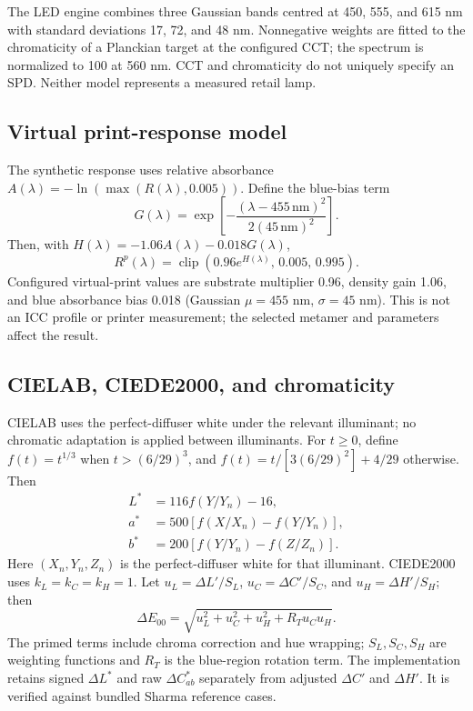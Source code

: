 \documentclass[journal]{IEEEtran}
\newcommand{\dE}{\ensuremath{\Delta E_{00}}}
\begin{document}
The LED engine combines three Gaussian bands centred at 450, 555, and 615 nm with standard deviations 17, 72, and 48 nm. Nonnegative weights are fitted to the chromaticity of a Planckian target at the configured CCT; the spectrum is normalized to 100 at 560 nm. CCT and chromaticity do not uniquely specify an SPD. Neither model represents a measured retail lamp.

\subsection{Virtual print-response model}
The synthetic response uses relative absorbance $A(\lambda)=-\ln(\max(R(\lambda),0.005))$. Define the blue-bias term
\begin{equation}
G(\lambda)=\exp\!\left[-\frac{(\lambda-455\,\mathrm{nm})^2}{2(45\,\mathrm{nm})^2}\right].
\end{equation}
Then, with $H(\lambda)=-1.06A(\lambda)-0.018G(\lambda)$,
\begin{equation}
R^p(\lambda)=\operatorname{clip}\!\left(0.96e^{H(\lambda)},\,0.005,\,0.995\right).
\end{equation}
Configured virtual-print values are substrate multiplier 0.96, density gain 1.06, and blue absorbance bias 0.018 (Gaussian $\mu=455$ nm, $\sigma=45$ nm). This is not an ICC profile or printer measurement; the selected metamer and parameters affect the result.

\subsection{CIELAB, CIEDE2000, and chromaticity}
CIELAB uses the perfect-diffuser white under the relevant illuminant; no chromatic adaptation is applied between illuminants. For $t\geq0$, define $f(t)=t^{1/3}$ when $t>(6/29)^3$, and $f(t)=t/[3(6/29)^2]+4/29$ otherwise. Then
\begin{align}
L^*&=116f(Y/Y_n)-16,\nonumber\\
a^*&=500[f(X/X_n)-f(Y/Y_n)],\nonumber\\
b^*&=200[f(Y/Y_n)-f(Z/Z_n)].
\end{align}
Here $(X_n,Y_n,Z_n)$ is the perfect-diffuser white for that illuminant. CIEDE2000 uses $k_L=k_C=k_H=1$. Let $u_L=\Delta L'/S_L$, $u_C=\Delta C'/S_C$, and $u_H=\Delta H'/S_H$; then
\begin{equation}
\dE=\sqrt{u_L^2+u_C^2+u_H^2+R_Tu_Cu_H}.
\end{equation}
The primed terms include chroma correction and hue wrapping; $S_L,S_C,S_H$ are weighting functions and $R_T$ is the blue-region rotation term. The implementation retains signed $\Delta L^*$ and raw $\Delta C^*_{ab}$ separately from adjusted $\Delta C'$ and $\Delta H'$. It is verified against bundled Sharma reference cases.
\end{document}
